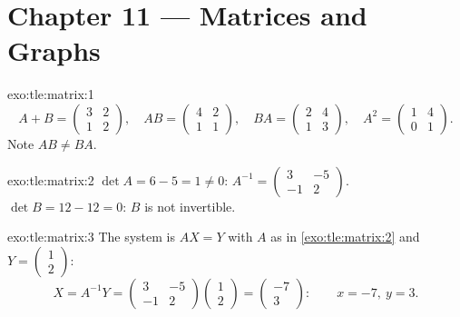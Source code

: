 \section*{Chapter 11 --- Matrices and Graphs}

\begin{solution}{exo:tle:matrix:1}
\[
A + B = \begin{pmatrix} 3 & 2\\ 1 & 2\end{pmatrix}, \quad
AB = \begin{pmatrix} 4 & 2\\ 1 & 1\end{pmatrix}, \quad
BA = \begin{pmatrix} 2 & 4\\ 1 & 3\end{pmatrix}, \quad
A^2 = \begin{pmatrix} 1 & 4\\ 0 & 1\end{pmatrix}.
\]
Note $AB \neq BA$.
\end{solution}

\begin{solution}{exo:tle:matrix:2}
$\det A = 6 - 5 = 1 \neq 0$:
$A^{-1} = \begin{pmatrix} 3 & -5\\ -1 & 2 \end{pmatrix}$.
$\det B = 12 - 12 = 0$: $B$ is not invertible.
\end{solution}

\begin{solution}{exo:tle:matrix:3}
The system is $AX = Y$ with $A$ as in \cref{exo:tle:matrix:2} and
$Y = \begin{pmatrix} 1\\ 2\end{pmatrix}$:
\[
X = A^{-1}Y = \begin{pmatrix} 3 & -5\\ -1 & 2\end{pmatrix}
\begin{pmatrix} 1\\ 2\end{pmatrix}
= \begin{pmatrix} -7\\ 3\end{pmatrix}:
\qquad x = -7,\ y = 3 .
\]
\end{solution}

